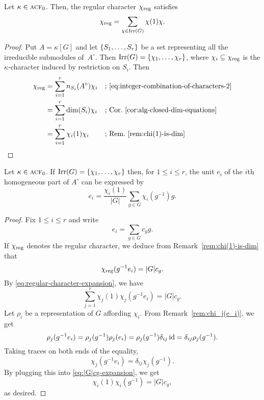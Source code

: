 \begin{lem}\label{lem:regular-character-expansion}
    Let $\kappa\in\operatorname{\textnormal{\textsc{acf}}}_0$. Then, the regular character\/ $\chi_{\mathrm{reg}}$ satisfies
    \begin{equation}\label{eq:regular-character-expansion}
        \chi_{\mathrm{reg}} = \sum_{\chi\in\operatorname{Irr}(G)}\chi(1)\chi.
    \end{equation}
\end{lem}

\begin{proof}
    Put $A=\kappa[G]$ and let $\{S_1,\dots,S_r\}$ be a set representing all the irreducible submodules of~$A^\circ$. Then $\operatorname{Irr}(G)=\{\chi_1,\dots,\chi_r\}$, where $\chi_i\subseteq\chi_{\mathrm{reg}}$ is the $\kappa$-character induced by restriction on $S_i$. Then
    \begin{align*}
        \chi_{\mathrm{reg}} &= \sum_{i=1}^rn_{S_i}(A^\circ)\chi_i
                &&\text{; \eqref{eq:integer-combination-of-characters-2}}\\
            &= \sum_{i=1}^r\dim(S_i)\chi_i
                &&\text{; Cor.~\ref{cor:alg-closed-dim-equations}}\\
            &= \sum_{i=1}^r\chi_i(1)\chi_i
                &&\text{; Rem.~\ref{rem:chi(1)-is-dim}}
    \end{align*}
\end{proof}

\begin{thm}\label{thm:ei-from-characters}
    Let\/ $\kappa\in\operatorname{\textnormal{\textsc{acf}}}_0$. If\/ $\operatorname{Irr}(G)=\{\chi_1,\dots,\chi_r\}$ then, for $1\le i\le r$, the unit\/ $e_i$ of the\/ $i$th homogeneous part of\/ $A^\circ$ can be expressed by
    \begin{equation}\label{eq:ei-from-characters}
        e_i = \frac{\chi_i(1)}{|G|}
            \sum_{g\in G}\chi_i(g^{-1})g.
    \end{equation}
\end{thm}

\begin{proof}
    Fix $1\le i\le r$ and write
    $$
        e_i = \sum_{g\in G}c_gg.
    $$
    If $\chi_{\mathrm{reg}}$ denotes the regular character, we deduce from Remark~\ref{rem:chi(1)-is-dim} that
    $$
        \chi_{\mathrm{reg}}(g^{-1}e_i)=|G|c_g.
    $$
    By \eqref{eq:regular-character-expansion}, we have
    \begin{equation}\label{eq:|G|cg-expansion}
        \sum_{j=1}^r\chi_j(1)\chi_j(g^{-1}e_i)=|G|c_g.
    \end{equation}
    Let $\rho_i$ be a representation of $G$ affording $\chi_i$. From Remark~\ref{rem:chi_j(e_i)}, we get
    $$
        \rho_j(g^{-1}e_i)=\rho_j(g^{-1})\rho_j(e_i)
            = \rho_j(g^{-1})\delta_{ij}\operatorname{id}
            = \delta_{ij}\rho_j(g^{-1}).
    $$
    Taking traces on both ends of the equality,
    $$
        \chi_j(g^{-1}e_i) = \delta_{ij}\chi_j(g^{-1}).
    $$
    By plugging this into \eqref{eq:|G|cg-expansion}, we get
    $$
        \chi_i(1)\chi_i(g^{-1})=|G|c_g,
    $$
    as desired.
\end{proof}

